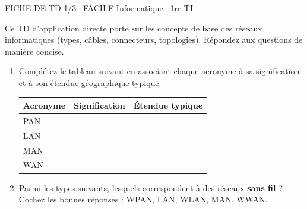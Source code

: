\documentclass[11pt]{article}
\begin{document}
\begin{tcolorbox}[enhanced,colback=popink,colframe=popink,arc=10pt,boxrule=0pt,left=12pt,right=12pt,top=9pt,bottom=9pt]
{\color{white}\popxbold\small FICHE DE TD 1/3 \textbullet\ FACILE \hfill Informatique \textbullet\ 1re TI\par}
\end{tcolorbox}
\vspace{4pt}
\noindent Ce TD d'application directe porte sur les concepts de base des réseaux informatiques (types, câbles, connecteurs, topologies). Répondez aux questions de manière concise.

\begin{exercice}
\begin{enumerate}
    \item Complétez le tableau suivant en associant chaque acronyme à sa signification et à son étendue géographique typique.
    \begin{tabular}{|l|l|l|}
    \hline
    \textbf{Acronyme} & \textbf{Signification} & \textbf{Étendue typique} \\
    \hline
    PAN &  &  \\
    \hline
    LAN &  &  \\
    \hline
    MAN &  &  \\
    \hline
    WAN &  &  \\
    \hline
    \end{tabular}
    \item Parmi les types suivants, lesquels correspondent à des réseaux \textbf{sans fil} ? Cochez les bonnes réponses : WPAN, LAN, WLAN, MAN, WWAN.
\end{enumerate}
\end{exercice}
\end{document}
